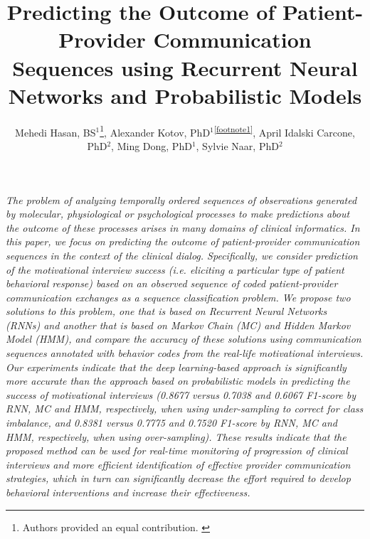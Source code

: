 \documentclass{amia_summit_2018}
\begin{document}
\title{Predicting the Outcome of Patient-Provider Communication Sequences using Recurrent Neural Networks and Probabilistic Models}

\author{Mehedi Hasan, BS$^{1}$\footnote[1]{Authors provided an equal contribution. \label{footnote1}}, Alexander Kotov, PhD$^{1}$\textsuperscript{\ref{footnote1}}, April Idalski Carcone, PhD$^{2}$, Ming Dong, PhD$^{1}$, Sylvie Naar, PhD$^{2}$}


\maketitle

\textit{The problem of analyzing temporally ordered sequences of observations generated by molecular, physiological or psychological processes to make predictions about the outcome of these processes arises in many domains of clinical informatics. In this paper, we focus on predicting the outcome of patient-provider communication sequences in the context of the clinical dialog. Specifically, we consider prediction of the motivational interview success (i.e. eliciting a particular type of patient behavioral response) based on an observed sequence of coded patient-provider communication exchanges as a sequence classification problem. We propose two solutions to this problem, one that is based on Recurrent Neural Networks (RNNs) and another that is based on Markov Chain (MC) and Hidden Markov Model (HMM), and compare the accuracy of these solutions using communication sequences annotated with behavior codes from the real-life motivational interviews. Our experiments indicate that the deep learning-based approach is significantly more accurate than the approach based on probabilistic models in predicting the success of motivational interviews (0.8677 versus 0.7038 and 0.6067 F1-score by RNN, MC and HMM, respectively, when using under-sampling to correct for class imbalance, and 0.8381 versus 0.7775 and 0.7520 F1-score by RNN, MC and HMM, respectively, when using over-sampling). These results indicate that the proposed method can be used for real-time monitoring of progression of clinical interviews and more efficient identification of effective provider communication strategies, which in turn can significantly decrease the effort required to develop behavioral interventions and increase their effectiveness.}
\end{document}
